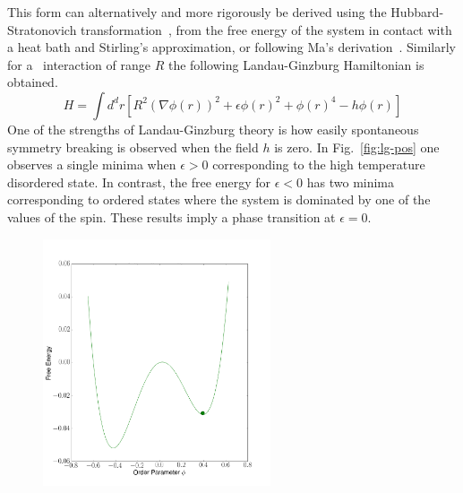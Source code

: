 This form can alternatively and more rigorously be derived using the Hubbard-Stratonovich transformation~\cite{altland}, from the free energy of the system in contact with a heat bath and Stirling's approximation, or following Ma's derivation~\cite{ma}.
Similarly for a \lr\ interaction of range $R$ the following Landau-Ginzburg Hamiltonian is obtained.%
\begin{equation}
\label{eq:landu-ginz_R}
H = \!\int d^dr [R^2(\nabla \phi(r))^2 + \epsilon \phi(r)^2 + \phi(r)^4 -h \phi(r) ]
\end{equation}%
One of the strengths of Landau-Ginzburg theory is how easily spontaneous symmetry breaking is observed when the field  $h$ is zero. In Fig.~\ref{fig:lg-pos} one observes a single minima when $\epsilon > 0$  corresponding to the high temperature disordered state. In contrast, the free energy  for $\epsilon < 0$  has two minima corresponding to  ordered states where the system is dominated by one of the  values of the spin. These results imply a phase transition at $\epsilon = 0$.
\begin{figure}[!h]
	\centering
	\includegraphics[width=0.6\textwidth]{Images/classicalNucleationStart.png}
	\label{fig:nuc_start_lg}
\end{figure}%
